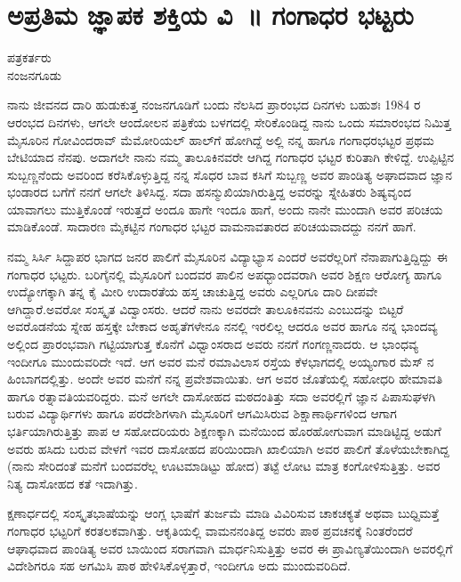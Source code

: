 {\fontsize{14}{16}\selectfont
\chapter{ಅಪ್ರತಿಮ ಜ್ಞಾಪಕ ಶಕ್ತಿಯ ವಿ~॥ ಗಂಗಾಧರ ಭಟ್ಟರು}

\begin{center}

ಪತ್ರಕರ್ತರು\\  
ನಂಜನಗೂಡು
\addrule
\end{center}

ನಾನು ಜೀವನದ ದಾರಿ ಹುಡುಕುತ್ತ ನಂಜನಗೂಡಿಗೆ ಬಂದು ನೆಲಸಿದ ಪ್ರಾರಂಭದ ದಿನಗಳು ಬಹುಶಃ 1984 ರ ಆರಂಭದ ದಿನಗಳು,  ಆಗಲೇ  ಆಂದೋಲನ ಪತ್ರಿಕೆಯ ಬಳಗದಲ್ಲಿ ಸೇರಿಕೊಂಡಿದ್ದ ನಾನು ಒಂದು ಸಮಾರಂಭದ ನಿಮಿತ್ತ ಮೈಸೂರಿನ  ಗೋವಿಂದ\-ರಾವ್ ಮೆಮೋರಿಯಲ್ ಹಾಲ್‍ಗೆ   ಹೋಗಿದ್ದೆ ಅಲ್ಲಿ ನನ್ನ ಹಾಗೂ ಗಂಗಾಧರಭಟ್ಟರ ಪ್ರಥಮ ಬೇಟಿಯಾದ ನೆನಪು. ಅದಾಗಲೇ ನಾನು ನಮ್ಮ ತಾಲೂಕಿನವರೇ ಆಗಿದ್ದ  ಗಂಗಾಧರ ಭಟ್ಟರ ಕುರಿತಾಗಿ ಕೇಳಿದ್ದೆ.   ಉಪ್ಪಿಟ್ಟಿನ ಸುಬ್ಬಣ್ಣನೆಂದು ಅವರಿಂದ ಕರೆಸಿಕೊಳ್ಳುತ್ತಿದ್ದ ನನ್ನ ಸೊಧರ ಬಾವ ಕಸಿಗೆ ಸುಬ್ಬಣ್ಣ  ಅವರ ಪಾಂಡಿತ್ಯ  ಅಘಾದವಾದ ಜ್ಞಾನ ಭಂಡಾರದ ಬಗೆಗೆ ನನಗೆ ಆಗಲೇ ತಿಳಿಸಿದ್ದ. ಸದಾ  ಹಸನ್ಮುಖಿಯಾಗಿರುತ್ತಿದ್ದ  ಅವರನ್ನು ಸ್ನೇಹಿತರು ಶಿಷ್ಯವೃಂದ ಯಾವಾಗಲು ಮುತ್ತಿಕೊಂಡೆ ಇರುತ್ತದೆ ಅಂದೂ ಹಾಗೇ  ಇಂದೂ ಹಾಗೆ, ಅಂದು ನಾನೇ ಮುಂದಾಗಿ ಅವರ  ಪರಿಚಯ ಮಾಡಿಕೊಂಡೆ.  ಸಾದಾರಣ ಮೈಕಟ್ಟಿನ  ಗಂಗಾಧರ ಭಟ್ಟರ ವಾಮನಾವತಾರದ ಪರಿಚಯವಾದದ್ದು ನನಗೆ ಹಾಗೆ.

ನಮ್ಮ  ಸಿರ್ಸಿ ಸಿದ್ದಾಪರ  ಭಾಗದ ಜನರ ಪಾಲಿಗೆ ಮೈಸೂರಿನ ವಿದ್ಯಾಭ್ಯಾಸ  ಎಂದರೆ ಅವರೆಲ್ಲರಿಗೆ ನೆನಾಪಾಗುತ್ತಿದ್ದಿದ್ದು  ಈ ಗಂಗಾಧರ ಭಟ್ಟರು. ಬರಿಗೈನಲ್ಲಿ ಮೈಸೂರಿಗೆ ಬಂದವರ ಪಾಲಿನ ಅಪಧ್ಭಾಂದವರಾಗಿ  ಅವರ ಶಿಕ್ಷಣ ಆರೋಗ್ಯ ಹಾಗೂ ಉದ್ಯೋಗಕ್ಕಾಗಿ   ತನ್ನ ಕೈ ಮೀರಿ  ಉದಾರತೆಯ ಹಸ್ತ ಚಾಚುತ್ತಿದ್ದ  ಅವರು ಎಲ್ಲರಿಗೂ ದಾರಿ ದೀಪವೇ  ಆಗಿದ್ದಾರೆ.ಅವರೋ ಸಂಸ್ಕೃತ ವಿದ್ವಾಂಸರು. ಆದರೆ ನಾನು  ಅವರದೇ ತಾಲೂಕಿನವನು ಎಂಬುದನ್ನು ಬಿಟ್ಟರೆ  ಅವರೊಡನೆಯ  ಸ್ನೇಹ ಹಸ್ತಕ್ಕೇ ಬೇಕಾದ ಅಹೃತೆಗಳೇನೂ ನನಲ್ಲಿ ಇರಲಿಲ್ಲ   ಆದರೂ  ಅವರ ಹಾಗೂ ನನ್ನ ಭಾಂದವ್ಯ     ಅಲ್ಲಿಂದ ಪ್ರಾರಂಭವಾಗಿ ಗಟ್ಟಿಯಾಗುತ್ತ ಕೊನೆಗೆ ವಿಧ್ವಾಂಸರಾದ ಅವರು  ನನಗೆ ಗಂಗಣ್ಣನಾದರು. ಆ ಭಾಂಧವ್ಯ ಇಂದೀಗೂ ಮುಂದುವರಿದೇ ಇದೆ.  ಆಗ ಅವರ ಮನೆ  ರಮಾವಿಲಾಸ ರಸ್ತೆಯ ಕೆಳಭಾಗದಲ್ಲಿ ಅಯ್ಯಂಗಾರ ಮೆಸ್ ನ ಹಿಂಬಾಗದಲ್ಲಿತ್ತು.   ಅಂದೇ ಅವರ ಮನೆಗೆ ನನ್ನ ಪ್ರವೇಶವಾಯಿತು.  ಆಗ ಅವರ ಜೊತೆಯಲ್ಲಿ ಸಹೋಧರಿ ಹೇಮಾವತಿ ಹಾಗೂ ರತ್ನಾವತಿಯವರಿದ್ದರು. ಮನೆ ಅಗಲೇ  ದಾಸೋಹದ ಮಠದಂತಿತ್ತು  ಸದಾ ಅವರಲ್ಲಿಗೆ ಜ್ಞಾನ ಪಿಪಾಸುಘಳಗಿ ಬರುವ ವಿದ್ಯಾರ್ಥಿಗಳು ಹಾಗೂ ಪರದೇಶಿಗಳಾಗಿ ಮೈಸೂರಿಗೆ ಆಗಮಿಸಿರುವ ಶಿಕ್ಷಾಣಾರ್ಥಿಗಳಿಂದ   ಆಗಾಗ ಭರ್ತಿಯಾಗಿರುತ್ತಿತ್ತು ಪಾಪ ಆ ಸಹೋದರಿಯರು ಶಿಕ್ಷಣಕ್ಕಾಗಿ ಮನೆಯಿಂದ ಹೊರಹೋಗುವಾಗ   ಮಾಡಿಟ್ಟಿದ್ದ ಅಡುಗೆ ಅವರು ಹಸಿದು ಬರುವ ವೇಳಗೆ ಇವರ ದಾಸೋಹದ ಪರಿಯಿಂದಾಗಿ  ಖಾಲಿಯಾಗಿ ಅವರ ಪಾಲಿಗೆ ತೊಳೆಯಬೇಕಾಗಿದ್ದ (ನಾನು  ಸೇರಿದಂತೆ ಮನೆಗೆ ಬಂದವರೆಲ್ಲ ಊಟಮಾಡಿಟ್ಟು ಹೋದ)   ತಟ್ಟೆ ಲೋಟ ಮಾತ್ರ ಕಂಗೋಳಿಸುತ್ತಿತ್ತು. ಅವರ ನಿತ್ಯ ದಾಸೋಹದ ಕತೆ ಇದಾಗಿತ್ತು. 

ಕ್ಷಣಾರ್ಧದಲ್ಲಿ  ಸಂಸ್ಕೃತಭಾಷೆಯನ್ನು ಆಂಗ್ಲ ಭಾಷೆಗೆ ತುರ್ಜಮೆ ಮಾಡಿ  ವಿವಿರಿಸುವ ಚಾಕಚಕ್ಯತೆ ಅಥವಾ ಬುಧ್ದಿಮತ್ತೆ ಗಂಗಾಧರ ಭಟ್ಟರಿಗೆ ಕರತಲಕವಾಗಿತ್ತು.  ಆಕೃತಿಯಲ್ಲಿ ವಾಮನನಂತಿದ್ದ ಅವರು ಪಾಠ ಪ್ರವಚನಕ್ಕೆ ನಿಂತರೆಂದರೆ ಆಘಾಧವಾದ ಪಾಂಡಿತ್ಯ ಅವರ ಬಾಯಿಂದ ಸರಾಗವಾಗಿ ಮಾರ್ಧನಿಸುತ್ತಿತ್ತು ಅವರ ಈ ಪ್ರಾವಿಣ್ಯತೆಯಿಂದಾಗಿ  ಅವರಲ್ಲಿಗೆ ವಿದೇಶಿಗರೂ ಸಹ  ಅಗಮಿಸಿ ಪಾಠ ಹೇಳಿಸಿಕೊಳ್ಳತ್ತಾರೆ, ಇಂದೀಗೂ ಅದು ಮುಂದುವರಿದಿದೆ.

}
